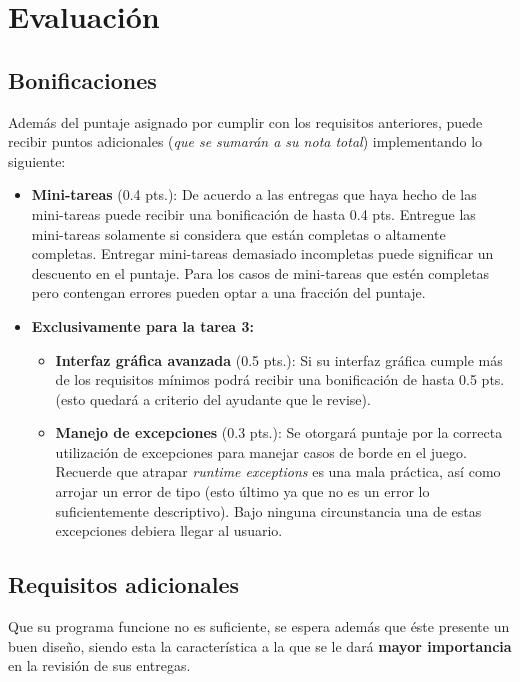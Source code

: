 \section{Evaluación}
  \subsection{Bonificaciones}
    Además del puntaje asignado por cumplir con los requisitos anteriores, puede recibir 
    puntos adicionales (\emph{que se sumarán a su nota total}) implementando lo siguiente:
    
    \begin{itemize}
      \item \textbf{Mini-tareas} (0.4 pts.): De acuerdo a las entregas que haya hecho de las 
        mini-tareas puede recibir una bonificación de hasta 0.4 pts.
        Entregue las mini-tareas solamente si considera que están completas o altamente completas.
        Entregar mini-tareas demasiado incompletas puede significar un descuento en el puntaje.
        Para los casos de mini-tareas que estén completas pero contengan errores pueden optar a una
        fracción del puntaje.
      \item \textbf{Exclusivamente para la tarea 3:}
      
      \begin{itemize}
        \item \textbf{Interfaz gráfica avanzada} (0.5 pts.): Si su interfaz gráfica cumple 
          más de los requisitos mínimos podrá recibir una bonificación de hasta 0.5 pts. 
          (esto quedará a criterio del ayudante que le revise).
        \item \textbf{Manejo de excepciones} (0.3 pts.): Se otorgará puntaje por la correcta 
          utilización de excepciones para manejar casos de borde en el juego.
          Recuerde que atrapar \textit{runtime exceptions} es una mala práctica, así como
          arrojar un error de tipo  (esto último ya que no es un error lo 
          suficientemente descriptivo).
          Bajo ninguna circunstancia una de estas excepciones debiera llegar al usuario.
      \end{itemize}
    \end{itemize}
  \subsection{Requisitos adicionales}
    Que su programa funcione no es suficiente, se espera además que éste presente un buen 
    diseño, siendo esta la característica a la que se le dará \textbf{mayor importancia} 
    en la revisión de sus entregas.

